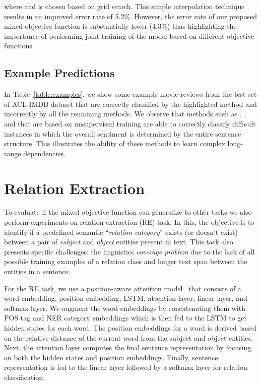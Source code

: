 \documentclass[letterpaper]{article}
\newcommand{\citep}{\cite}
\begin{document}
where  and is chosen based on grid search. This simple interpolation technique results in an improved error rate of 5.2\%. However, the error rate of our proposed mixed objective function is substantially lower (4.3\%) thus highlighting the importance of performing joint training of the model based on different objective functions.

\subsection{Example Predictions}
In Table~\ref{table:examples}, we show some example movie reviews from the test set of ACL-IMDB dataset that are correctly classified by the highlighted method and incorrectly by all the remaining methods. We observe that methods such as , , and  that are based on unsupervised training are able to correctly classify difficult instances in which the overall sentiment is determined by the entire sentence structure. This illustrates the ability of these methods to learn complex long-range dependencies.

\section{Relation Extraction}    \label{sec:RE}
To evaluate if the mixed objective function can generalize to other tasks we also perform experiments on relation extraction (RE) task. In this, the objective is to identify if a predefined semantic ``\emph{relation category}'' exists (or doesn't exist) between a pair of \emph{subject} and \emph{object} entities present in text. This task also presents specific challenges: the linguistics \emph{coverage problem} due to the lack of all possible training examples of a relation class and longer text span between the entities in a sentence.

For the RE task, we use a position-aware attention model~\citep{yuhao2017slot} that consists of a word embedding, position embedding, LSTM, attention layer, linear layer, and softmax layer. We augment the word embeddings by concatenating them with POS tag and NER category embeddings which is then fed to the LSTM to get hidden states for each word. The position embeddings for a word is derived based on the relative distance of the current word from the subject and object entities. Next, the attention layer computes the final sentence representation by focusing on both the hidden states and position embeddings. Finally, sentence representation is fed to the linear layer followed by a softmax layer for relation classification.
\end{document}
